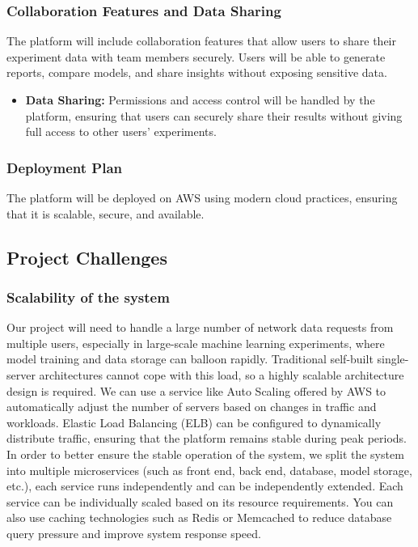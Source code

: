 \documentclass[12pt]{article}
\begin{document}
\subsubsection{Collaboration Features and Data Sharing}

The platform will include collaboration features that allow users to share their experiment data with team members securely. Users will be able to generate reports, compare models, and share insights without exposing sensitive data.

\begin{itemize}
\item \textbf{Data Sharing:} Permissions and access control will be handled by the platform, ensuring that users can securely share their results without giving full access to other users’ experiments.
\end{itemize}


\subsubsection{Deployment Plan}

The platform will be deployed on AWS using modern cloud practices, ensuring that it is scalable, secure, and available.

\subsection{Project Challenges}
\subsubsection{Scalability of the system}
Our project will need to handle a large number of network data requests from multiple users, especially in large-scale machine learning experiments, where model training and data storage can balloon rapidly. Traditional self-built single-server architectures cannot cope with this load, so a highly scalable architecture design is required. We can use a service like Auto Scaling offered by AWS to automatically adjust the number of servers based on changes in traffic and workloads. Elastic Load Balancing (ELB) can be configured to dynamically distribute traffic, ensuring that the platform remains stable during peak periods. In order to better ensure the stable operation of the system, we split the system into multiple microservices (such as front end, back end, database, model storage, etc.), each service runs independently and can be independently extended. Each service can be individually scaled based on its resource requirements. You can also use caching technologies such as Redis or Memcached to reduce database query pressure and improve system response speed.
\end{document}
